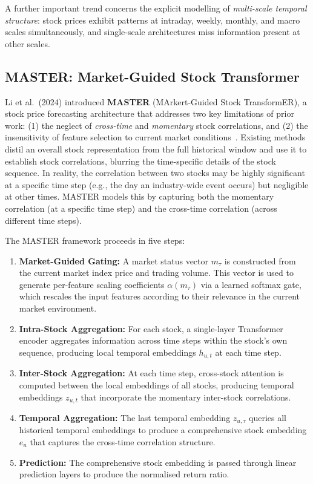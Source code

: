 \documentclass[a4paper,11pt]{report}
\begin{document}
A further important trend concerns the explicit modelling of \emph{multi-scale temporal structure}: stock prices exhibit patterns at intraday, weekly, monthly, and macro scales simultaneously, and single-scale architectures miss information present at other scales.

\subsection{MASTER: Market-Guided Stock Transformer}

Li et al.\ (2024) introduced \textbf{MASTER} (MArkert-Guided Stock TransformER), a stock price forecasting architecture that addresses two key limitations of prior work: (1) the neglect of \emph{cross-time} and \emph{momentary} stock correlations, and (2) the insensitivity of feature selection to current market conditions~\cite{li2024master}. Existing methods distil an overall stock representation from the full historical window and use it to establish stock correlations, blurring the time-specific details of the stock sequence. In reality, the correlation between two stocks may be highly significant at a specific time step (e.g., the day an industry-wide event occurs) but negligible at other times. MASTER models this by capturing both the momentary correlation (at a specific time step) and the cross-time correlation (across different time steps).

The MASTER framework proceeds in five steps:

\begin{enumerate}
    \item \textbf{Market-Guided Gating:} A market status vector $m_\tau$ is constructed from the current market index price and trading volume. This vector is used to generate per-feature scaling coefficients $\alpha(m_\tau)$ via a learned softmax gate, which rescales the input features according to their relevance in the current market environment.
    \item \textbf{Intra-Stock Aggregation:} For each stock, a single-layer Transformer encoder aggregates information across time steps within the stock's own sequence, producing local temporal embeddings $h_{u,t}$ at each time step.
    \item \textbf{Inter-Stock Aggregation:} At each time step, cross-stock attention is computed between the local embeddings of all stocks, producing temporal embeddings $z_{u,t}$ that incorporate the momentary inter-stock correlations.
    \item \textbf{Temporal Aggregation:} The last temporal embedding $z_{u,\tau}$ queries all historical temporal embeddings to produce a comprehensive stock embedding $e_u$ that captures the cross-time correlation structure.
    \item \textbf{Prediction:} The comprehensive stock embedding is passed through linear prediction layers to produce the normalised return ratio.
\end{enumerate}
\end{document}
